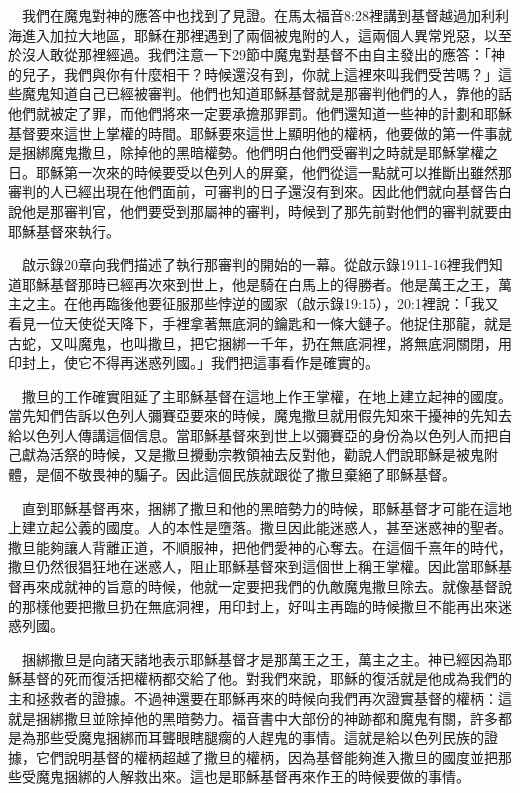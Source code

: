 \documentclass{book}
\begin{document}
　我們在魔鬼對神的應答中也找到了見證。在馬太福音8:28裡講到基督越過加利利海進入加拉大地區，耶穌在那裡遇到了兩個被鬼附的人，這兩個人異常兇惡，以至於沒人敢從那裡經過。我們注意一下29節中魔鬼對基督不由自主發出的應答：「神的兒子，我們與你有什麼相干？時候還沒有到，你就上這裡來叫我們受苦嗎？」這些魔鬼知道自己已經被審判。他們也知道耶穌基督就是那審判他們的人，靠他的話他們就被定了罪，而他們將來一定要承擔那罪罰。他們還知道一些神的計劃和耶穌基督要來這世上掌權的時間。耶穌要來這世上顯明他的權柄，他要做的第一件事就是捆綁魔鬼撒旦，除掉他的黑暗權勢。他們明白他們受審判之時就是耶穌掌權之日。耶穌第一次來的時候要受以色列人的屏棄，他們從這一點就可以推斷出雖然那審判的人已經出現在他們面前，可審判的日子還沒有到來。因此他們就向基督告白說他是那審判官，他們要受到那屬神的審判，時候到了那先前對他們的審判就要由耶穌基督來執行。

　啟示錄20章向我們描述了執行那審判的開始的一幕。從啟示錄1911-16裡我們知道耶穌基督那時已經再次來到世上，他是騎在白馬上的得勝者。他是萬王之王，萬主之主。在他再臨後他要征服那些悖逆的國家（啟示錄19:15），20:1裡說：「我又看見一位天使從天降下，手裡拿著無底洞的鑰匙和一條大鏈子。他捉住那龍，就是古蛇，又叫魔鬼，也叫撒旦，把它捆綁一千年，扔在無底洞裡，將無底洞關閉，用印封上，使它不得再迷惑列國。」我們把這事看作是確實的。

　撒旦的工作確實阻延了主耶穌基督在這地上作王掌權，在地上建立起神的國度。當先知們告訴以色列人彌賽亞要來的時候，魔鬼撒旦就用假先知來干擾神的先知去給以色列人傳講這個信息。當耶穌基督來到世上以彌賽亞的身份為以色列人而把自己獻為活祭的時候，又是撒旦攪動宗教領袖去反對他，勸說人們說耶穌是被鬼附體，是個不敬畏神的騙子。因此這個民族就跟從了撒旦棄絕了耶穌基督。

　直到耶穌基督再來，捆綁了撒旦和他的黑暗勢力的時候，耶穌基督才可能在這地上建立起公義的國度。人的本性是墮落。撒旦因此能迷惑人，甚至迷惑神的聖者。撒旦能夠讓人背離正道，不順服神，把他們愛神的心奪去。在這個千熹年的時代，撒旦仍然很猖狂地在迷惑人，阻止耶穌基督來到這個世上稱王掌權。因此當耶穌基督再來成就神的旨意的時候，他就一定要把我們的仇敵魔鬼撒旦除去。就像基督說的那樣他要把撒旦扔在無底洞裡，用印封上，好叫主再臨的時候撒旦不能再出來迷惑列國。

　捆綁撒旦是向諸天諸地表示耶穌基督才是那萬王之王，萬主之主。神已經因為耶穌基督的死而復活把權柄都交給了他。對我們來說，耶穌的復活就是他成為我們的主和拯救者的證據。不過神還要在耶穌再來的時候向我們再次證實基督的權柄：這就是捆綁撒旦並除掉他的黑暗勢力。福音書中大部份的神跡都和魔鬼有關，許多都是為那些受魔鬼捆綁而耳聾眼瞎腿瘸的人趕鬼的事情。這就是給以色列民族的證據，它們說明基督的權柄超越了撒旦的權柄，因為基督能夠進入撒旦的國度並把那些受魔鬼捆綁的人解救出來。這也是耶穌基督再來作王的時候要做的事情。
\end{document}
